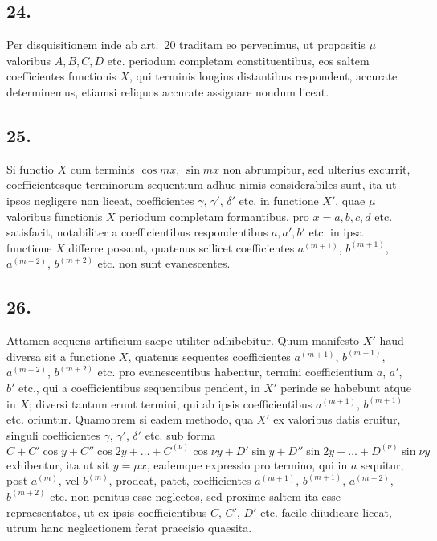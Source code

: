 \documentclass[12pt,a4paper]{article}
\theoremstyle{plain}
\begin{document}
\subsection*{24.}

Per disquisitionem inde ab art.\ 20 traditam eo pervenimus, ut propositis $\mu$ valoribus $A, B, C, D$ etc. periodum completam constituentibus, eos saltem coefficientes
functionis $X$, qui terminis longius distantibus respondent, accurate determinemus, etiamsi reliquos accurate assignare nondum liceat.

\subsection*{25.}

Si functio $X$ cum terminis $\cos mx$, $\sin mx$ non abrumpitur, sed ulterius excurrit, coefficientesque terminorum sequentium adhuc nimis considerabiles sunt,
ita ut ipsos negligere non liceat, coefficientes $\gamma$, $\gamma'$, $\delta'$ etc. in functione $X'$, quae $\mu$ valoribus functionis $X$ periodum completam formantibus, pro $x = a, b, c, d$ etc. satisfacit, notabiliter a coefficientibus respondentibus $a, a', b'$ etc. in ipsa functione
$X$ differre possunt, quatenus scilicet coefficientes $a^{(m+1)}$, $b^{(m+1)}$, $a^{(m+2)}$, $b^{(m+2)}$ etc. non sunt evanescentes.

\subsection*{26.}

Attamen sequens artificium saepe utiliter adhibebitur. Quum manifesto $X'$ haud diversa sit a functione $X$, quatenus sequentes coefficientes $a^{(m+1)}$, $b^{(m+1)}$, $a^{(m+2)}$, $b^{(m+2)}$ etc. pro evanescentibus habentur, termini coefficientium $a$, $a'$, $b'$ etc.,
qui a coefficientibus sequentibus pendent, in $X'$ perinde se habebunt atque in $X$; diversi tantum erunt termini, qui ab ipsis coefficientibus $a^{(m+1)}$, $b^{(m+1)}$ etc. oriuntur.
Quamobrem si eadem methodo, qua $X'$ ex valoribus datis eruitur, singuli coefficientes
$\gamma$, $\gamma'$, $\delta'$ etc. sub forma
\[
C + C'\cos y + C''\cos 2y + \ldots + C^{(\nu)}\cos \nu y + D'\sin y + D''\sin 2y + \ldots + D^{(\nu)}\sin \nu y
\]
exhibentur, ita ut sit $y = \mu x$, eademque expressio pro termino, qui in $a$ sequitur, post $a^{(m)}$, vel $b^{(m)}$, prodeat, patet, coefficientes $a^{(m+1)}$, $b^{(m+1)}$, $a^{(m+2)}$,
$b^{(m+2)}$ etc. non penitus esse neglectos, sed proxime saltem ita esse repraesentatos, ut ex ipsis coefficientibus $C$, $C'$, $D'$ etc. facile diiudicare liceat, utrum hanc
neglectionem ferat praecisio quaesita.
\end{document}
